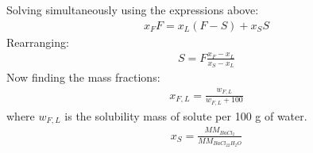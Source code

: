 \documentclass[letterpaper,10pt,english]{jupyterBook}
\begin{document}
\sphinxAtStartPar
Solving simultaneously using the expressions above:
\begin{equation*}
\begin{split}
x_FF= x_L(F - S) + x_SS
\end{split}
\end{equation*}
\sphinxAtStartPar
Rearranging:
\begin{equation*}
\begin{split}
S = F \frac{x_F-x_L}{x_S-x_L}
\end{split}
\end{equation*}
\sphinxAtStartPar
Now finding the mass fractions:
\begin{equation*}
\begin{split}
x_{F,L}=\frac{w_{F,L}}{w_{F,L} + 100}
\end{split}
\end{equation*}
\sphinxAtStartPar
where \(w_{F,L}\) is the solubility mass of solute per 100 g of water.
\begin{equation*}
\begin{split}
x_S=\frac{MM_{BaCl_2}}{MM_{BaCl_22H_2O}}
\end{split}
\end{equation*}
\end{document}
